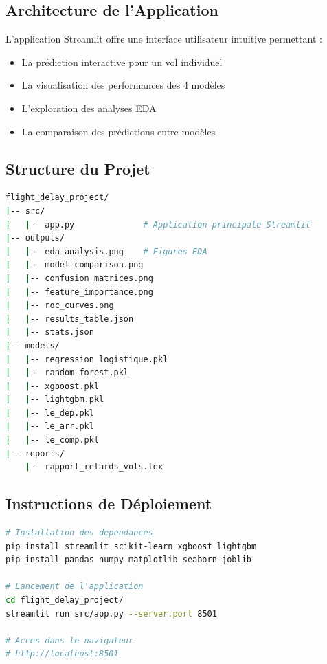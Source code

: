 \documentclass[12pt,a4paper]{article}
\begin{document}
\subsection{Architecture de l'Application}

L'application Streamlit offre une interface utilisateur intuitive permettant :
\begin{itemize}[leftmargin=*]
  \item La prédiction interactive pour un vol individuel
  \item La visualisation des performances des 4 modèles
  \item L'exploration des analyses EDA
  \item La comparaison des prédictions entre modèles
\end{itemize}

\subsection{Structure du Projet}

\begin{lstlisting}[language=bash, caption={Structure des fichiers du projet}]
flight_delay_project/
|-- src/
|   |-- app.py              # Application principale Streamlit
|-- outputs/
|   |-- eda_analysis.png    # Figures EDA
|   |-- model_comparison.png
|   |-- confusion_matrices.png
|   |-- feature_importance.png
|   |-- roc_curves.png
|   |-- results_table.json
|   |-- stats.json
|-- models/
|   |-- regression_logistique.pkl
|   |-- random_forest.pkl
|   |-- xgboost.pkl
|   |-- lightgbm.pkl
|   |-- le_dep.pkl
|   |-- le_arr.pkl
|   |-- le_comp.pkl
|-- reports/
    |-- rapport_retards_vols.tex
\end{lstlisting}

\subsection{Instructions de Déploiement}

\begin{lstlisting}[language=bash, caption={Commandes de déploiement}]
# Installation des dependances
pip install streamlit scikit-learn xgboost lightgbm
pip install pandas numpy matplotlib seaborn joblib

# Lancement de l'application
cd flight_delay_project/
streamlit run src/app.py --server.port 8501

# Acces dans le navigateur
# http://localhost:8501
\end{lstlisting}
\end{document}
